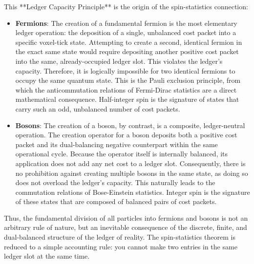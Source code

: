 \documentclass[11pt,a4paper]{article}
\begin{document}
This **Ledger Capacity Principle** is the origin of the spin-statistics connection:

\begin{itemize}
    \item \textbf{Fermions}: The creation of a fundamental fermion is the most elementary ledger operation: the deposition of a single, unbalanced cost packet into a specific voxel-tick state. Attempting to create a second, identical fermion in the exact same state would require depositing another positive cost packet into the same, already-occupied ledger slot. This violates the ledger's capacity. Therefore, it is logically impossible for two identical fermions to occupy the same quantum state. This is the Pauli exclusion principle, from which the anticommutation relations of Fermi-Dirac statistics are a direct mathematical consequence. Half-integer spin is the signature of states that carry such an odd, unbalanced number of cost packets.

    \item \textbf{Bosons}: The creation of a boson, by contrast, is a composite, ledger-neutral operation. The creation operator for a boson deposits both a positive cost packet and its dual-balancing negative counterpart within the same operational cycle. Because the operator itself is internally balanced, its application does not add any net cost to a ledger slot. Consequently, there is no prohibition against creating multiple bosons in the same state, as doing so does not overload the ledger's capacity. This naturally leads to the commutation relations of Bose-Einstein statistics. Integer spin is the signature of these states that are composed of balanced pairs of cost packets.
\end{itemize}

Thus, the fundamental division of all particles into fermions and bosons is not an arbitrary rule of nature, but an inevitable consequence of the discrete, finite, and dual-balanced structure of the ledger of reality. The spin-statistics theorem is reduced to a simple accounting rule: you cannot make two entries in the same ledger slot at the same time.
\end{document}
